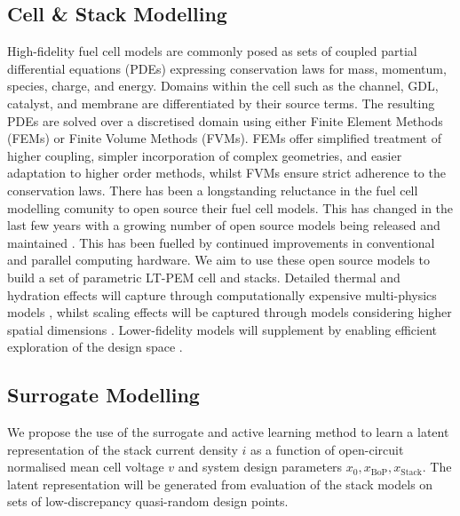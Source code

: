 \subsection{Cell \& Stack Modelling}
High-fidelity fuel cell models are commonly posed as sets of coupled partial differential equations (PDEs) expressing conservation laws for mass, momentum, species, charge, and energy.
Domains within the cell such as the channel, GDL, catalyst, and membrane are differentiated by their source terms. The resulting PDEs are solved over a discretised domain using either Finite Element Methods (FEMs) or Finite Volume Methods (FVMs).
FEMs offer simplified treatment of higher coupling, simpler incorporation of complex geometries, and easier adaptation to higher order methods, whilst FVMs ensure strict adherence to the conservation laws.
There has been a longstanding reluctance in the fuel cell modelling comunity to open source their fuel cell models.
This has changed in the last few years with a growing number of open source models being released and maintained \cite{vetterFreeOpenReference2019, secanellOpenFCSTOpenSourceMathematical2014, zhangOpenFuelCell2NewComputational2024,  koneOpenSourceToolboxPEM2018, gassAlphaPEMOpensourceDynamic2025}.
This has been fuelled by continued improvements in conventional and parallel computing hardware.
We aim to use these open source models to build a set of parametric LT-PEM cell and stacks.
Detailed thermal and hydration effects will capture through computationally expensive multi-physics models \cite{secanellOpenFCSTOpenSourceMathematical2014, zhangOpenFuelCell2NewComputational2024, vetterFreeOpenReference2019}, whilst scaling effects will be captured through models considering higher spatial dimensions \cite{secanellOpenFCSTOpenSourceMathematical2014, zhangOpenFuelCell2NewComputational2024, koneOpenSourceToolboxPEM2018a}.
Lower-fidelity models will supplement by enabling efficient exploration of the design space \cite{kulikovskyPhysicallyBasedAnalytical2013a, ohayreFuelCellFundamentals2016, larminieFuelCellSystems2003}.

\subsection{Surrogate Modelling}
We propose the use of the surrogate and active learning method to learn a latent representation of the stack current density $i$ as a function of open-circuit normalised mean cell voltage $v$ and system design parameters $x_0, x_{\text{BoP}}, x_{\text{Stack}}$.
The latent representation will be generated from evaluation of the stack models on sets of low-discrepancy quasi-random design points.


